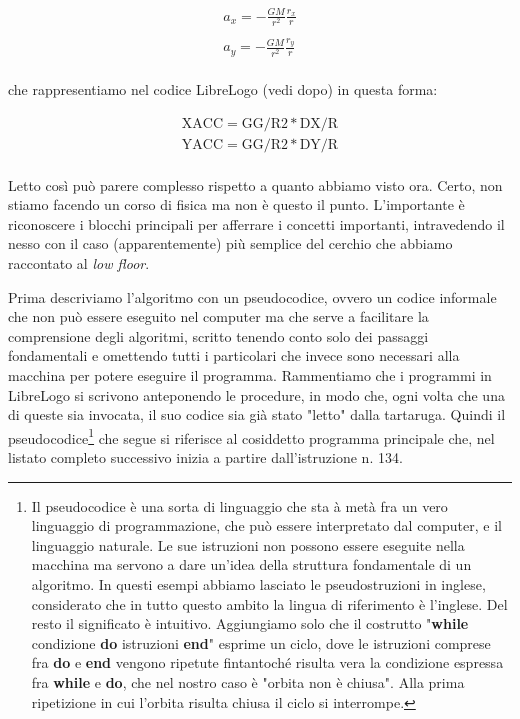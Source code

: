 \begin{equation}
\begin{array}{ll}
a_x=-\frac{GM}{r^2}\frac{r_x}{r}\\
\\
a_y=-\frac{GM}{r^2}\frac{r_y}{r}\\
\end{array}
\end{equation}

che rappresentiamo nel codice LibreLogo (vedi dopo) in questa forma:

\begin{equation}
\begin{array}{ll}
\textrm{XACC}=\textrm{GG} / \textrm{R2} * \textrm{DX} / \textrm{R}\\
\textrm{YACC}=\textrm{GG} / \textrm{R2} * \textrm{DY} / \textrm{R}\\
\end{array}
\end{equation}

Letto così può parere complesso rispetto a quanto abbiamo visto ora. Certo, non stiamo facendo un corso di fisica ma non è questo il punto. L'importante è riconoscere i blocchi principali per afferrare i concetti importanti, intravedendo il nesso con il caso (apparentemente) più semplice del cerchio che abbiamo raccontato  al \textit{low floor}. 

Prima descriviamo l'algoritmo con un pseudocodice, ovvero un codice informale che non può essere eseguito nel computer ma che serve a facilitare la comprensione degli algoritmi, scritto tenendo conto solo dei passaggi fondamentali e omettendo tutti i particolari che invece sono necessari alla macchina per potere eseguire il programma. Rammentiamo che i programmi in LibreLogo si scrivono anteponendo le procedure, in modo che, ogni volta che una di queste sia invocata, il suo codice sia già stato "letto" dalla tartaruga. Quindi il pseudocodice\footnote{Il pseudocodice è una sorta di linguaggio che sta à metà fra un vero linguaggio di programmazione, che può essere interpretato dal computer, e il linguaggio naturale. Le sue istruzioni non possono essere eseguite nella macchina ma servono a dare un'idea della struttura fondamentale di un algoritmo. In questi esempi abbiamo lasciato le pseudostruzioni in inglese, considerato che in tutto questo ambito la lingua di riferimento è l'inglese. Del resto il significato è intuitivo. Aggiungiamo solo che il costrutto "\textbf{while} condizione \textbf{do} istruzioni \textbf{end}" esprime un ciclo, dove le istruzioni comprese fra \textbf{do} e \textbf{end} vengono ripetute fintantoché risulta vera la condizione espressa fra \textbf{while} e \textbf{do}, che nel nostro caso è "orbita non è chiusa". Alla prima ripetizione in cui l'orbita risulta chiusa il ciclo si interrompe.} che segue si riferisce al cosiddetto programma principale che, nel listato completo successivo inizia a partire dall'istruzione n. 134.

